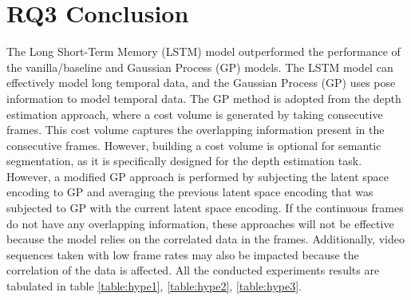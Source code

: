 	
	\newpage
	
	\section{RQ3 Conclusion}   
	
	The Long Short-Term Memory (LSTM) model outperformed the performance of the vanilla/baseline and Gaussian Process (GP) models. The LSTM model can effectively model long temporal data, and the Gaussian Process (GP) uses pose information to model temporal data. The GP method is adopted from the depth estimation approach, where a cost volume is generated by taking consecutive frames. This cost volume captures the overlapping information present in the consecutive frames. However, building a cost volume is optional for semantic segmentation, as it is specifically designed for the depth estimation task.
	However, a modified GP approach is performed by subjecting the latent space encoding to GP and averaging the previous latent space encoding that was subjected to GP with the current latent space encoding. If the continuous frames do not have any overlapping information, these approaches will not be effective because the model relies on the correlated data in the frames. Additionally, video sequences taken with low frame rates may also be impacted because the correlation of the data is affected. All the conducted experiments results are tabulated in table \ref{table:hype1}, \ref{table:hype2}, \ref{table:hype3}.
	
	
	



